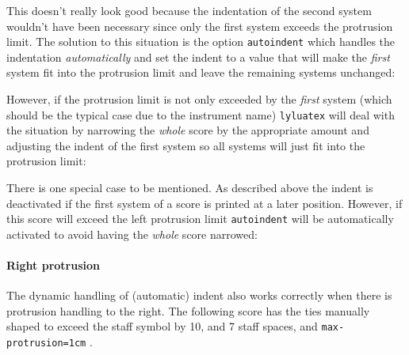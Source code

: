 \documentclass{scrartcl}
\begin{document}
This doesn't really look good because the indentation of the second system
wouldn't have been necessary since only the first system exceeds the protrusion
limit. The solution to this situation is the option \texttt{autoindent} which
handles the indentation \emph{automatically} and set the indent to a value that
will make the \emph{first} system fit into the protrusion limit and leave the
remaining systems unchanged:



However, if the protrusion limit is not only exceeded by the \emph{first} system
(which should be the typical case due to the instrument name) \texttt{lyluatex}
will deal with the situation by narrowing the \emph{whole} score by the
appropriate amount and adjusting the indent of the first system so all systems
will just fit into the protrusion limit:


There is one special case to be mentioned. As described above the indent is
deactivated if the first system of a score is printed at a later position.
However, if this score will exceed the left protrusion limit \texttt{autoindent}
will be automatically activated to avoid having the \emph{whole} score narrowed:


\paragraph{Right protrusion}
The dynamic handling of (automatic) indent also works correctly when there is
protrusion handling to the right. The following score has the ties manually
shaped to exceed the staff symbol by 10, and 7 staff spaces, and
\texttt{max-protrusion=1cm} .

\end{document}

